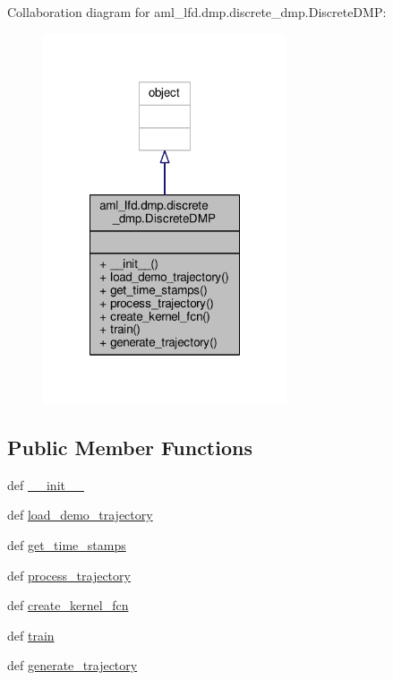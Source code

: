Collaboration diagram for aml\-\_\-lfd.\-dmp.\-discrete\-\_\-dmp.\-Discrete\-D\-M\-P\-:\nopagebreak
\begin{figure}[H]
\begin{center}
\leavevmode
\includegraphics[width=204pt]{classaml__lfd_1_1dmp_1_1discrete__dmp_1_1_discrete_d_m_p__coll__graph}
\end{center}
\end{figure}
\subsection*{Public Member Functions}
\begin{DoxyCompactItemize}
\item 
def \hyperlink{classaml__lfd_1_1dmp_1_1discrete__dmp_1_1_discrete_d_m_p_a0afae018e62e15edb234540305900106}{\-\_\-\-\_\-init\-\_\-\-\_\-}
\item 
def \hyperlink{classaml__lfd_1_1dmp_1_1discrete__dmp_1_1_discrete_d_m_p_a1e4c3e90a2e09b9d0632f0609d0e046d}{load\-\_\-demo\-\_\-trajectory}
\item 
def \hyperlink{classaml__lfd_1_1dmp_1_1discrete__dmp_1_1_discrete_d_m_p_a742b9e083ff20498f00dac0a3a823031}{get\-\_\-time\-\_\-stamps}
\item 
def \hyperlink{classaml__lfd_1_1dmp_1_1discrete__dmp_1_1_discrete_d_m_p_a1b999ffff82a65a6ed652d95a642772d}{process\-\_\-trajectory}
\item 
def \hyperlink{classaml__lfd_1_1dmp_1_1discrete__dmp_1_1_discrete_d_m_p_a35fc0754f0382c6850197f9d6aaa8201}{create\-\_\-kernel\-\_\-fcn}
\item 
def \hyperlink{classaml__lfd_1_1dmp_1_1discrete__dmp_1_1_discrete_d_m_p_af7cfa075be80acd8250fdcbfa4a7f05a}{train}
\item 
def \hyperlink{classaml__lfd_1_1dmp_1_1discrete__dmp_1_1_discrete_d_m_p_a240f470f6d319d32b429c5b8e494004e}{generate\-\_\-trajectory}
\end{DoxyCompactItemize}


